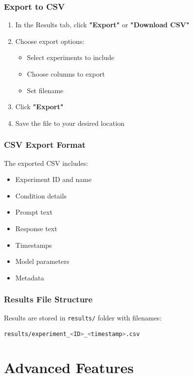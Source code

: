 \documentclass[11pt,a4paper]{article}
\begin{document}
\subsubsection{Export to CSV}
\begin{enumerate}
    \item In the Results tab, click \textbf{"Export"} or \textbf{"Download CSV"}
    \item Choose export options:
    \begin{itemize}
        \item Select experiments to include
        \item Choose columns to export
        \item Set filename
    \end{itemize}
    \item Click \textbf{"Export"}
    \item Save the file to your desired location
\end{enumerate}

\subsubsection{CSV Export Format}
The exported CSV includes:
\begin{itemize}
    \item Experiment ID and name
    \item Condition details
    \item Prompt text
    \item Response text
    \item Timestamps
    \item Model parameters
    \item Metadata
\end{itemize}

\subsubsection{Results File Structure}
Results are stored in \texttt{results/} folder with filenames:
\begin{lstlisting}[language=bash]
results/experiment_<ID>_<timestamp>.csv
\end{lstlisting}

\section{Advanced Features}
\label{sec:advanced}
\end{document}
